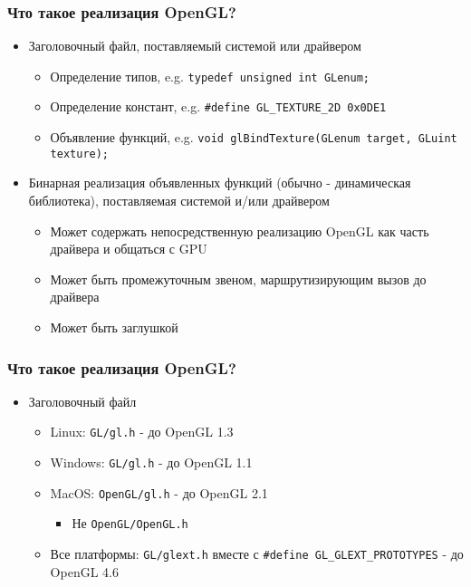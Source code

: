 \documentclass{beamer}
\begin{document}
\begin{frame}[fragile]
\frametitle{Что такое реализация OpenGL?}
\begin{itemize}
\item Заголовочный файл, поставляемый системой или драйвером
\begin{itemize}
\item Определение типов, e.g. \verb|typedef unsigned int GLenum;|
\item Определение констант, e.g. \verb|#define GL_TEXTURE_2D 0x0DE1|
\item Объявление функций, e.g. \verb|void glBindTexture(GLenum target, GLuint texture);|
\end{itemize}
\pause
\item Бинарная реализация объявленных функций (обычно - динамическая библиотека), поставляемая системой и/или драйвером
\begin{itemize}
\item Может содержать непосредственную реализацию OpenGL как часть драйвера и общаться с GPU
\item Может быть промежуточным звеном, маршрутизирующим вызов до драйвера
\item Может быть заглушкой
\end{itemize}
\end{itemize}
\end{frame}

\begin{frame}[fragile]
\frametitle{Что такое реализация OpenGL?}
\begin{itemize}
\item Заголовочный файл
\begin{itemize}
\item Linux: \verb|GL/gl.h| - до OpenGL 1.3
\pause
\item Windows: \verb|GL/gl.h| - до OpenGL 1.1
\pause
\item MacOS: \verb|OpenGL/gl.h| - до OpenGL 2.1
\begin{itemize}
\item {\color{red}Не} \verb|OpenGL/OpenGL.h|
\end{itemize}
\item Все платформы: \verb|GL/glext.h| вместе с \verb|#define GL_GLEXT_PROTOTYPES| - до OpenGL 4.6
\end{itemize}
\end{itemize}
\end{frame}
\end{document}

